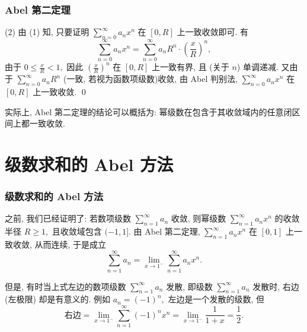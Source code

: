 
\begin{frame}
\frametitle{Abel 第二定理}

(2) 由 (1) 知, 只要证明 $\displaystyle \sum_{n=0}^{\infty} a_n x^n$ 在 $[0, R]$ 上一致收敛即可. 有
\[
\sum_{n=0}^{\infty} a_n x^n = \sum_{n=0}^{\infty} a_n R^n \cdot \left( \frac{x}{R} \right)^n,
\]
由于 $0 \leqslant \frac{x}{R} < 1,$ 因此 $\left( \frac{x}{R} \right)^n$ 在 $[0, R]$ 上一致有界, 且 (关于 $n$) 单调递减. 又由于 $\displaystyle \sum_{n=0}^{\infty} a_n R^n$ (一致, 若视为函数项级数)收敛, 由 Abel 判别法, $\displaystyle \sum_{n=0}^{\infty} a_n x^n$ 在 $[0, R]$ 上一致收敛.
\qed

\pause
\vspace{1em}

\begin{remark}
实际上, Abel 第二定理的结论可以概括为: 幂级数在包含于其收敛域内的任意闭区间上都一致收敛.
\end{remark}

\end{frame}


\section{级数求和的 Abel 方法}


\begin{frame}
\frametitle{级数求和的 Abel 方法}

之前, 我们已经证明了: 若数项级数 $\displaystyle \sum_{n=1}^\infty a_n$ 收敛, 则幂级数 $\displaystyle \sum_{n=1}^\infty a_n x^n$ 的收敛半径 $R \geqslant 1,$ 且收敛域包含 $(-1, 1].$ 由 Abel 第二定理, $\displaystyle \sum_{n=1}^\infty a_n x^n$ 在 $[0, 1]$ 上一致收敛, 从而连续, 于是成立
\[
\sum_{n=1}^\infty a_n = \lim_{x \to 1^-} \sum_{n=1}^{\infty} a_n x^n.
\]

\pause

但是, 有时当上式左边的数项级数 $\displaystyle \sum_{n=1}^\infty a_n$ 发散, 即级数 $\displaystyle \sum_{n=1}^\infty a_n$ 发散时, 右边 (左极限) 却是有意义的.
\pause
例如 $a_n = (-1)^n,$ 左边是一个发散的级数, 但
\begin{equation*}
\text{右边} = \lim_{x \to 1^-} \sum_{n=1}^{\infty} (-1)^n x^n = \lim_{x \to 1^-} \dfrac{1}{1 + x} = \dfrac{1}{2}.
\end{equation*}

\end{frame}

